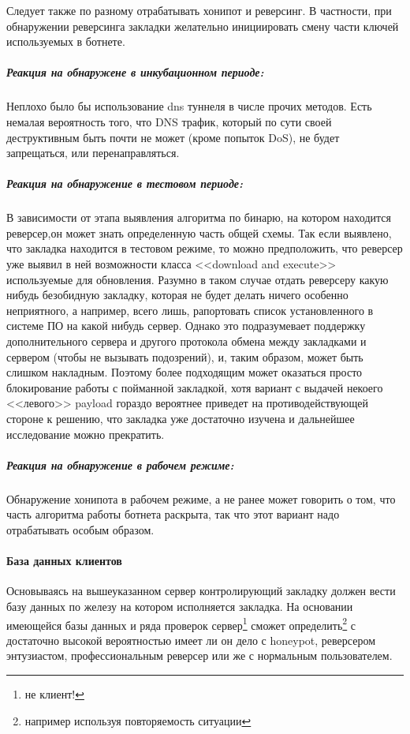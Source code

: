 Следует также по разному отрабатывать хонипот и реверсинг. В частности, при обнаружении
реверсинга закладки желательно инициировать смену части ключей используемых в ботнете.

\subparagraph{Реакция на обнаружене в инкубационном периоде:}
Неплохо было бы использование dns туннеля в числе прочих методов.
Есть немалая вероятность того, что DNS трафик, который по сути своей
деструктивным быть почти не может (кроме попыток DoS), не будет
запрещаться, или перенаправляться.

\subparagraph{Реакция на обнаружение в тестовом периоде:}
В зависимости от этапа выявления алгоритма по бинарю, на котором
находится реверсер,он может знать определенную часть общей схемы. Так
если выявлено, что закладка находится в тестовом режиме, то можно
предположить, что реверсер уже выявил в ней возможности класса
<<download and execute>> используемые для обновления. Разумно в таком
случае отдать реверсеру какую нибудь  безобидную закладку, которая не
будет делать ничего особенно неприятного, а например, всего лишь,
рапортовать список установленного в системе ПО на какой нибудь сервер.
Однако это подразумевает поддержку дополнительного сервера и другого протокола
обмена между закладками и сервером (чтобы не вызывать подозрений), и,
таким образом, может быть слишком накладным. Поэтому более подходящим
может оказаться просто блокирование работы с пойманной закладкой, хотя вариант с
выдачей некоего <<левого>> payload гораздо вероятнее приведет на
противодействующей стороне к решению, что закладка уже достаточно изучена и
дальнейшее исследование можно прекратить.

\subparagraph{Реакция на обнаружение в рабочем режиме:\\}
Обнаружение хонипота в рабочем режиме, а не ранее может говорить о том,
что часть алгоритма работы ботнета раскрыта, так что этот вариант надо отрабатывать
особым образом.


\paragraph{База данных клиентов\\}
Основываясь на вышеуказанном сервер контролирующий закладку должен вести
базу данных по железу  на котором исполняется закладка. На  основании
имеющейся базы данных и ряда проверок сервер\footnote{не клиент!} сможет
определить\footnote{например используя повторяемость ситуации} с
достаточно высокой вероятностью имеет ли он дело с honeypot,
реверсером энтузиастом, профессиональным реверсер или же с нормальным
пользователем.


